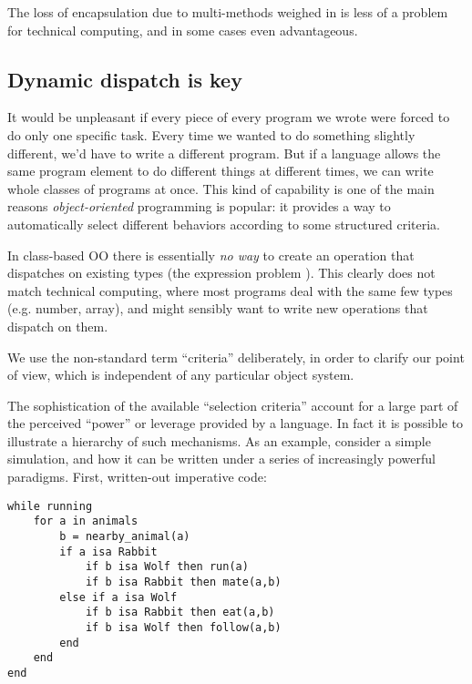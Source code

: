 The loss of encapsulation due to multi-methods weighed in \cite{binarymethods}
is less of a problem for technical computing, and in some cases even
advantageous.

\subsection{Dynamic dispatch is key}


It would be unpleasant if every piece of every program we wrote were forced
to do only one specific task. Every time we wanted to do something slightly
different, we'd have to write a different program. But if a language
allows the same program element to do different things at different times,
we can write whole classes of programs at once. This kind of capability is
one of the main reasons \emph{object-oriented} programming is popular: it
provides a way to automatically select different behaviors according to
some structured criteria.

In class-based OO there is essentially \emph{no way} to create an operation
that dispatches on existing types (the expression problem \cite{wadler1998expression}).
This clearly
does not match technical computing, where most programs deal with the same
few types (e.g. number, array), and might sensibly want to write new operations
that dispatch on them.


We use the non-standard term ``criteria'' deliberately, in order
to clarify our point of view, which is independent of any particular
object system.

The sophistication of the available ``selection criteria'' account for a
large part of the perceived ``power'' or leverage provided by a language.
In fact it is possible to illustrate a hierarchy of such mechanisms.
As an example, consider a simple simulation, and how it can be written
under a series of increasingly powerful paradigms. First, written-out
imperative code:

\begin{singlespace}
\begin{verbatim}
while running
    for a in animals
        b = nearby_animal(a)
        if a isa Rabbit
            if b isa Wolf then run(a)
            if b isa Rabbit then mate(a,b)
        else if a isa Wolf
            if b isa Rabbit then eat(a,b)
            if b isa Wolf then follow(a,b)
        end
    end
end
\end{verbatim}
\end{singlespace}


